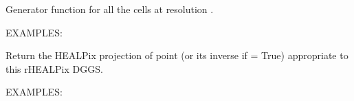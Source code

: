 \documentclass[a4paper,12ptopenany,oneside,english]{sphinxmanual}
\begin{document}
\begin{fulllineitems}
\begin{fulllineitems}
\end{fulllineitems}


\begin{fulllineitems}
\label{\detokenize{dggs:rhealpixdggs.dggs.RHEALPixDGGS.grid}}
\pysigstartsignatures
\pysiglinewithargsret
{}
{}
{}
\pysigstopsignatures
\sphinxAtStartPar
Generator function for all the cells at resolution .

\sphinxAtStartPar
EXAMPLES:

\begin{sphinxVerbatim}[commandchars=\\\{\}]
  
  
\PYG{p}{[}    \PYG{p}{]}
\end{sphinxVerbatim}

\end{fulllineitems}


\begin{fulllineitems}
\label{\detokenize{dggs:rhealpixdggs.dggs.RHEALPixDGGS.healpix}}
\pysigstartsignatures
\pysiglinewithargsret
{}
{\sphinxparamcomma {}\sphinxparamcomma {}}
{}
\pysigstopsignatures
\sphinxAtStartPar
Return the HEALPix projection of point  (or its inverse if
 = True) appropriate to this rHEALPix DGGS.

\sphinxAtStartPar
EXAMPLES:


\end{fulllineitems}
\end{fulllineitems}
\end{document}
